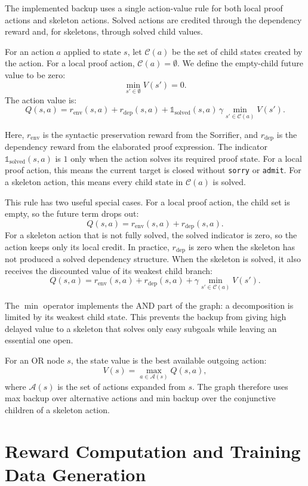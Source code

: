 The implemented backup uses a single action-value rule for both local proof actions and skeleton
actions. Solved actions are credited through the dependency reward and, for skeletons, through solved
child values.

For an action \(a\) applied to state \(s\), let \(\mathcal{C}(a)\) be the set of child states created by the
action. For a local proof action, \(\mathcal{C}(a)=\emptyset\). We define the empty-child future value to
be zero:
\[
\min_{s' \in \emptyset} V(s') = 0.
\]
The action value is:
\[
Q(s,a) =
r_{\mathrm{env}}(s,a)
+
r_{\mathrm{dep}}(s,a)
+
\mathds{1}_{\mathrm{solved}}(s,a)\,
\gamma
\min_{s' \in \mathcal{C}(a)} V(s').
\]

Here, \(r_{\mathrm{env}}\) is the syntactic preservation reward from the Sorrifier, and
\(r_{\mathrm{dep}}\) is the dependency reward from the elaborated proof expression. The indicator
\(\mathds{1}_{\mathrm{solved}}(s,a)\) is \(1\) only when the action solves its required proof state. For a
local proof action, this means the current target is closed without \texttt{sorry} or \texttt{admit}. For a
skeleton action, this means every child state in \(\mathcal{C}(a)\) is solved.

This rule has two useful special cases. For a local proof action, the child set is empty, so the future term
drops out:
\[
Q(s,a)=r_{\mathrm{env}}(s,a)+r_{\mathrm{dep}}(s,a).
\]
For a skeleton action that is not fully solved, the solved indicator is zero, so the action keeps only its
local credit. In practice, \(r_{\mathrm{dep}}\) is zero when the skeleton has not produced a solved
dependency structure. When the skeleton is solved, it also receives the discounted value of its weakest
child branch:
\[
Q(s,a)=
r_{\mathrm{env}}(s,a)
+
r_{\mathrm{dep}}(s,a)
+
\gamma \min_{s' \in \mathcal{C}(a)} V(s').
\]

The \(\min\) operator implements the AND part of the graph: a decomposition is limited by its weakest
child state. This prevents the backup from giving high delayed value to a skeleton that solves only easy
subgoals while leaving an essential one open.

For an OR node \(s\), the state value is the best available outgoing action:
\[
V(s)=\max_{a \in \mathcal{A}(s)} Q(s,a),
\]
where \(\mathcal{A}(s)\) is the set of actions expanded from \(s\). The graph therefore uses max backup
over alternative actions and min backup over the conjunctive children of a skeleton action.

\section{Reward Computation and Training Data Generation}

